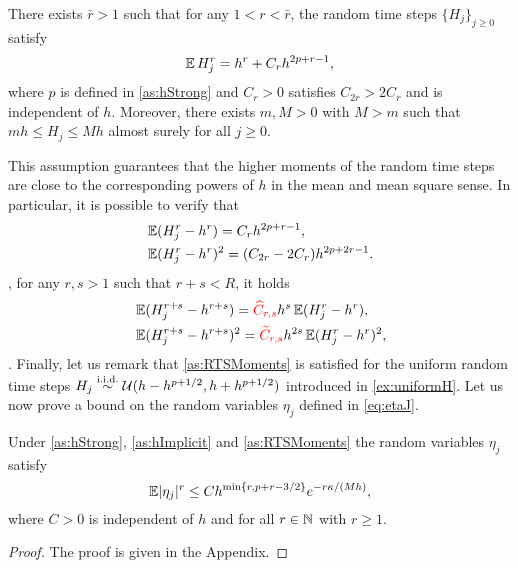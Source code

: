 \documentclass[10pt]{article}
\begin{document}
\begin{assumption}\label{as:RTSMoments} There exists $\bar r > 1$ such that for any $1 < r < \bar r$, the random time steps $\{H_j\}_{j\geq 0}$ satisfy
	\begin{equation}
	\operatorname{\mathbb{E}} H_j^r = h^r + C_rh^{2p+r-1},
	\end{equation}
	where $p$ is defined in \cref{as:hStrong} and $C_r > 0$ satisfies $C_{2r} > 2C_r$ and is independent of $h$. Moreover, there exists $m, M > 0$ with $M > m$ such that $mh \leq H_j \leq Mh$ almost surely for all $j \geq 0$.
\end{assumption}
This assumption guarantees that the higher moments of the random time steps are close to the corresponding powers of $h$ in the mean and mean square sense. In particular, it is possible to verify that
\begin{equation}
\begin{aligned}
	&\operatorname{\mathbb{E}}(H_j^r - h^r) = C_r h^{2p+r-1},\\
	&\operatorname{\mathbb{E}}(H_j^r - h^r)^2 = (C_{2r} - 2C_r) h^{2p+2r-1}.
\end{aligned}
\end{equation}
, for any $r, s > 1$ such that $r + s < R$, it holds
\begin{equation}\label{eq:higherHigherMoments}
\begin{aligned}
	&\operatorname{\mathbb{E}}(H_j^{r+s} - h^{r+s}) = {\color{red}\widehat C_{r,s}} h^s \operatorname{\mathbb{E}}(H_j^r - h^r),\\
	&\operatorname{\mathbb{E}}(H_j^{r+s} - h^{r+s})^2 = {\color{red}\widetilde C_{r,s}} h^{2s} \operatorname{\mathbb{E}}(H_j^r - h^r)^2,
\end{aligned}
\end{equation}
. Finally, let us remark that \cref{as:RTSMoments} is satisfied for the uniform random time steps $H_j \stackrel{\text{i.i.d.}}{\sim} \mathcal U(h-h^{p+1/2}, h+h^{p+1/2})$ introduced in \cref{ex:uniformH}. Let us now prove a bound on the random variables $\eta_j$ defined in \eqref{eq:etaJ}.
\begin{lemma}\label{lem:BoundEtaJ} Under \cref{as:hStrong}, \cref{as:hImplicit} and \cref{as:RTSMoments}  the random variables $\eta_j$ satisfy
	\begin{equation}
	\operatorname{\mathbb{E}} \lvert\eta_j\rvert^r \leq C h^{\min\{r, p+r-3/2\}} e^{-r\kappa/(Mh)}, 
	\end{equation}
	where $C > 0$ is independent of $h$ and for all $r \in \mathbb{N}$ with $r \geq 1$.
\end{lemma}
\begin{proof} The proof is given in the Appendix. \end{proof}
\end{document}
